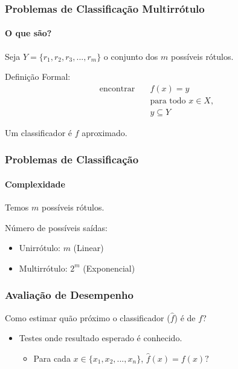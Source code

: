 \documentclass[10pt,fleqn]{beamer}
\begin{document}
\begin{frame}
  \frametitle{Problemas de Classificação Multirrótulo}
  \framesubtitle{O que são?}
  
  Seja $Y=\{r_1,r_2,r_3,...,r_m\}$ o conjunto dos $m$ possíveis rótulos.
  \begin{block}{Definição Formal:}
  \begin{align}
    \textrm{encontrar}
      \quad & f(x)=y \\
  	  \quad & \textrm{para todo }x \in X, \nonumber \\
  	  \quad & y\subseteq Y
	  \nonumber
  \end{align}
  \end{block}
  
  Um classificador é $f$ aproximado.
  
\end{frame}


\begin{frame}
  \frametitle{Problemas de Classificação}
  \framesubtitle{Complexidade}
  
  Temos $m$ possíveis rótulos.
  
  Número de possíveis saídas:
  \begin{itemize}
   \item Unirrótulo: $m$ (Linear)
   \item Multirrótulo: $2^m$ (Exponencial)
  \end{itemize}

\end{frame}

\begin{frame}
  \frametitle{Avaliação de Desempenho}
  Como estimar quão próximo o classificador ($\hat{f}$) é de $f$?
  
  \begin{itemize}
   \item Testes onde resultado esperado é conhecido.
   \begin{itemize}
    \item Para cada $x\in \{x_1,x_2,...,x_n\}$, $\hat{f}(x)=f(x)?$
   \end{itemize}

  \end{itemize}

\end{frame}
\end{document}

